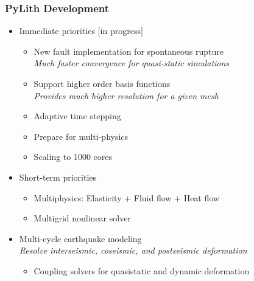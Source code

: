 \documentclass{beamer}
\newcommand{\status}[1]{{[\color{blue}#1]}}
\begin{document}
\begin{frame}
  \frametitle{PyLith Development}
  
  \begin{itemize}
  \item Immediate priorities \status{in progress}
    \begin{itemize}
    \item New fault implementation for spontaneous rupture \\
      {\it Much faster convergence for quasi-static simulations}
    \item Support higher order basis functions \\
      {\it Provides much higher resolution for a given mesh}
    \item Adaptive time stepping
    \item Prepare for multi-physics
    \item Scaling to 1000 cores
    \end{itemize}
  \item Short-term priorities
    \begin{itemize}
    \item Multiphysics: Elasticity + Fluid flow + Heat flow
    \item Multigrid nonlinear solver
    \end{itemize}
  \item Multi-cycle earthquake modeling\\
    {\it Resolve interseismic, coseismic, and postseismic deformation}
    \begin{itemize}
    \item Coupling solvers for quasistatic and dynamic deformation
    \end{itemize}
  \end{itemize}

\end{frame}
\end{document}
